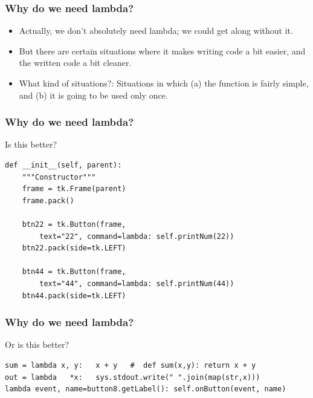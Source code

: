\begin{frame}[fragile]\frametitle{Why do we need lambda?}

    \begin{itemize}
    \item  Actually, we don't absolutely need lambda; we could get along without it. 
    \item But there are certain situations where it makes writing code a bit easier, and the written code a bit cleaner. 
    \item What kind of situations?: Situations in which (a) the function is fairly simple, and (b) it is going to be used only once.
    \end{itemize}

\end{frame}

\begin{frame}[fragile]\frametitle{Why do we need lambda?}

Is this better?
        \begin{lstlisting}
def __init__(self, parent):
    """Constructor"""
    frame = tk.Frame(parent)
    frame.pack()
 
    btn22 = tk.Button(frame,
        text="22", command=lambda: self.printNum(22))
    btn22.pack(side=tk.LEFT)
 
    btn44 = tk.Button(frame,
        text="44", command=lambda: self.printNum(44))
    btn44.pack(side=tk.LEFT)
\end{lstlisting}

\end{frame}


\begin{frame}[fragile]\frametitle{Why do we need lambda?}

Or is this better?
        \begin{lstlisting}
sum = lambda x, y:   x + y   #  def sum(x,y): return x + y
out = lambda   *x:   sys.stdout.write(" ".join(map(str,x)))
lambda event, name=button8.getLabel(): self.onButton(event, name)
\end{lstlisting}

\end{frame}

